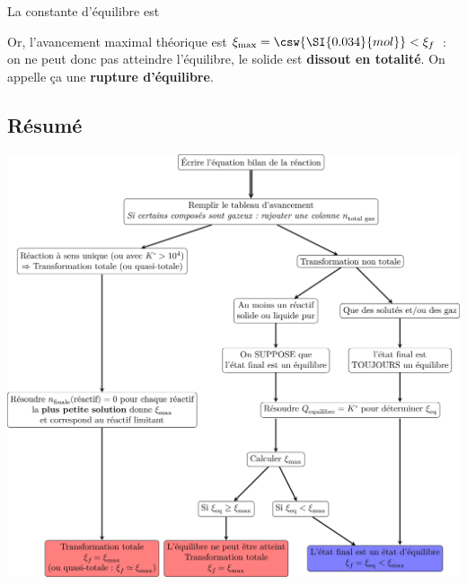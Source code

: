 \documentclass[../../main/main.tex]{subfiles}
\begin{document}
La constante d'équilibre est

Or, l'avancement maximal théorique est $\xi_{\max} = \csw{\SI{0.034}{mol}} <
	\xi_f$~: on ne peut donc pas atteindre l'équilibre, le solide est
\textbf{dissout en totalité}. On appelle ça une \textbf{rupture d'équilibre}.

\subsection{Résumé}

\begin{center}
	\includegraphics[width=\linewidth]{resume}
\end{center}
\end{document}
